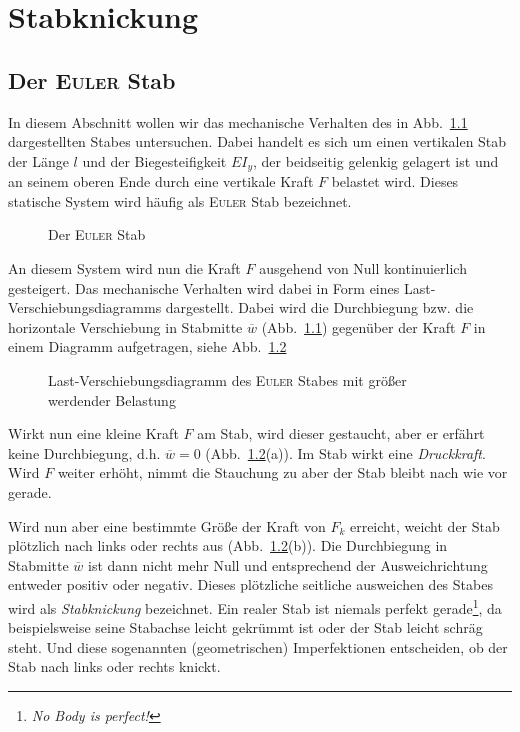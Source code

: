 
\chapter{Stabknickung}

\section{Der \textsc{Euler} Stab}
%
In diesem Abschnitt wollen wir das mechanische Verhalten des in Abb.~\ref{fig:3-1} dargestellten Stabes untersuchen.
Dabei handelt es sich um einen vertikalen Stab der Länge $l$ und der Biegesteifigkeit $EI_y$, der beidseitig gelenkig gelagert ist und an seinem oberen Ende durch eine vertikale Kraft $F$ belastet wird.
Dieses statische System wird häufig als \textsc{Euler} Stab bezeichnet. 
%
\begin{figure}[h!]
	\centering
	
	\caption{Der \textsc{Euler} Stab}
	\label{fig:3-1}
\end{figure}
%

An diesem System wird nun die Kraft $F$ ausgehend von Null kontinuierlich gesteigert.
Das mechanische Verhalten wird dabei in Form eines Last-Verschiebungsdiagramms dargestellt.
Dabei wird die Durchbiegung bzw. die horizontale Verschiebung in Stabmitte $\overline{w}$ (Abb.~\ref{fig:3-1}) gegenüber der Kraft $F$ in einem Diagramm aufgetragen, siehe Abb.~\ref{fig:3-2}
%
\begin{figure}[h!]
	\centering
	
	\caption{Last-Verschiebungsdiagramm des \textsc{Euler} Stabes mit größer werdender Belastung}
	\label{fig:3-2}
\end{figure}
%

Wirkt nun eine kleine Kraft $F$ am Stab, wird dieser gestaucht, aber er erfährt keine Durchbiegung, d.h. $\overline{w}=0$ (Abb.~\ref{fig:3-2}(a)). Im Stab wirkt eine \emph{Druckkraft}.
Wird $F$ weiter erhöht, nimmt die Stauchung zu aber der Stab bleibt nach wie vor gerade. 

Wird nun aber eine bestimmte Größe der Kraft von $F_k$ erreicht, weicht der Stab plötzlich nach links oder rechts aus (Abb.~\ref{fig:3-2}(b)).
Die Durchbiegung in Stabmitte $\overline{w}$ ist dann nicht mehr Null und entsprechend der Ausweichrichtung entweder positiv oder negativ.
Dieses plötzliche seitliche ausweichen des Stabes wird als \emph{Stabknickung} bezeichnet.
Ein realer Stab ist niemals perfekt gerade\footnote{\textit{\glqq No Body is perfect!\grqq}}, da beispielsweise seine Stabachse leicht gekrümmt ist oder der Stab leicht schräg steht.
Und diese sogenannten (geometrischen) Imperfektionen entscheiden, ob der Stab nach links oder rechts knickt. 

